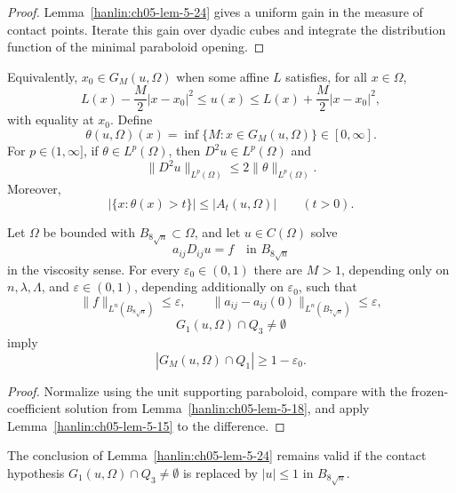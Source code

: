 \begin{proof}
\sketch Lemma~\ref{hanlin:ch05-lem-5-24} gives a uniform gain in the
measure of contact points. Iterate this gain over dyadic cubes and integrate
the distribution function of the minimal paraboloid opening.
\end{proof}

Equivalently, $x_0\in G_M(u,\Omega)$ when some affine $L$ satisfies,
for all $x\in\Omega$,
\[
L(x)-\frac M2|x-x_0|^2\leq u(x)
\leq L(x)+\frac M2|x-x_0|^2,
\]
with equality at $x_0$. Define
\[
\theta(u,\Omega)(x)=\inf\{M:x\in G_M(u,\Omega)\}\in[0,\infty].
\]
For $p\in(1,\infty]$, if $\theta\in L^p(\Omega)$, then
$D^2u\in L^p(\Omega)$ and
\[
\|D^2u\|_{L^p(\Omega)}\leq2\|\theta\|_{L^p(\Omega)}.
\]
Moreover,
\[
|\{x:\theta(x)>t\}|\leq|A_t(u,\Omega)|\qquad(t>0).
\]

\begin{lemma}\label{hanlin:ch05-lem-5-24}
Let $\Omega$ be bounded with $B_{8\sqrt n}\subset\Omega$, and let
$u\in C(\Omega)$ solve
\[
a_{ij}D_{ij}u=f\quad\text{in }B_{8\sqrt n}
\]
in the viscosity sense. For every $\varepsilon_0\in(0,1)$ there are
$M>1$, depending only on $n,\lambda,\Lambda$, and $\varepsilon\in(0,1)$,
depending additionally on $\varepsilon_0$, such that
\[
\|f\|_{L^n(B_{8\sqrt n})}\leq\varepsilon,
\qquad
\|a_{ij}-a_{ij}(0)\|_{L^n(B_{7\sqrt n})}\leq\varepsilon,
\]
\[
G_1(u,\Omega)\cap Q_3\neq\emptyset
\]
imply
\[
|G_M(u,\Omega)\cap Q_1|\geq1-\varepsilon_0.
\]
\end{lemma}

\begin{proof}
\sketch Normalize using the unit supporting paraboloid, compare with the
frozen-coefficient solution from Lemma~\ref{hanlin:ch05-lem-5-18}, and
apply Lemma~\ref{hanlin:ch05-lem-5-15} to the difference.
\end{proof}



\begin{remark}\label{hanlin:ch05-rem-5-25}
The conclusion of Lemma~\ref{hanlin:ch05-lem-5-24} remains valid if the
contact hypothesis $G_1(u,\Omega)\cap Q_3\neq\emptyset$ is replaced by
$|u|\leq1$ in $B_{8\sqrt n}$.
\end{remark}
